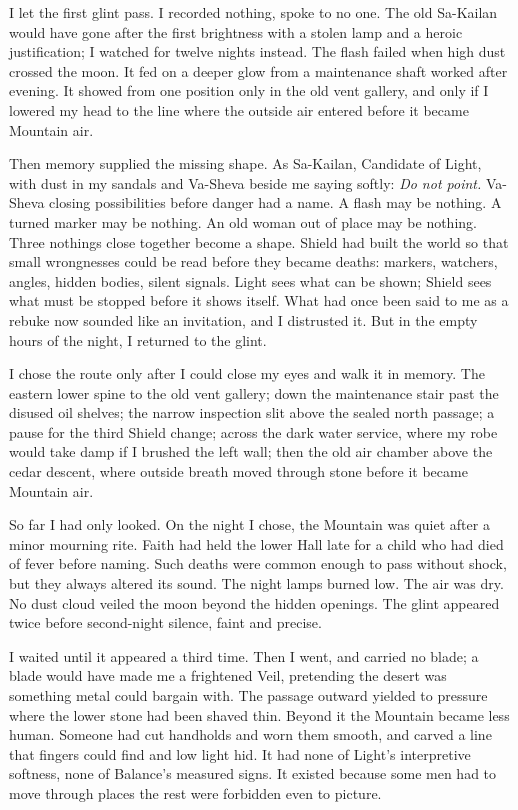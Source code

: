 I let the first glint pass. I recorded nothing, spoke to no one. The old Sa-Kailan would have gone after the first brightness with a stolen lamp and a heroic justification; I watched for twelve nights instead. The flash failed when high dust crossed the moon. It fed on a deeper glow from a maintenance shaft worked after evening. It showed from one position only in the old vent gallery, and only if I lowered my head to the line where the outside air entered before it became Mountain air.\par

Then memory supplied the missing shape. As Sa-Kailan, Candidate of Light, with dust in my sandals and Va-Sheva beside me saying softly: \textit{Do not point.} Va-Sheva closing possibilities before danger had a name. A flash may be nothing. A turned marker may be nothing. An old woman out of place may be nothing. Three nothings close together become a shape. Shield had built the world so that small wrongnesses could be read before they became deaths: markers, watchers, angles, hidden bodies, silent signals. Light sees what can be shown; Shield sees what must be stopped before it shows itself. What had once been said to me as a rebuke now sounded like an invitation, and I distrusted it. But in the empty hours of the night, I returned to the glint. \par

I chose the route only after I could close my eyes and walk it in memory. The eastern lower spine to the old vent gallery; down the maintenance stair past the disused oil shelves; the narrow inspection slit above the sealed north passage; a pause for the third Shield change; across the dark water service, where my robe would take damp if I brushed the left wall; then the old air chamber above the cedar descent, where outside breath moved through stone before it became Mountain air.

So far I had only looked. On the night I chose, the Mountain was quiet after a minor mourning rite. Faith had held the lower Hall late for a child who had died of fever before naming. Such deaths were common enough to pass without shock, but they always altered its sound. The night lamps burned low. The air was dry. No dust cloud veiled the moon beyond the hidden openings. The glint appeared twice before second-night silence, faint and precise.\par

I waited until it appeared a third time. Then I went, and carried no blade; a blade would have made me a frightened Veil, pretending the desert was something metal could bargain with. The passage outward yielded to pressure where the lower stone had been shaved thin. Beyond it the Mountain became less human. Someone had cut handholds and worn them smooth, and carved a line that fingers could find and low light hid. It had none of Light's interpretive softness, none of Balance's measured signs. It existed because some men had to move through places the rest were forbidden even to picture.\par

